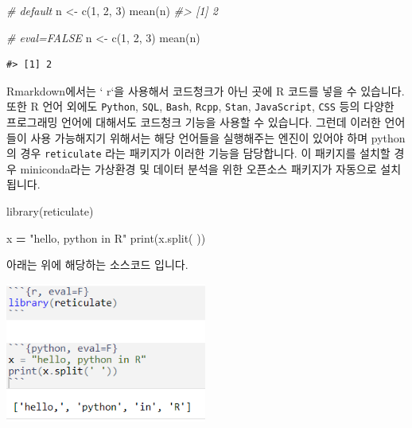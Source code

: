 \documentclass[
]{book}
\newenvironment{Shaded}{\begin{snugshade}}{\end{snugshade}}
\newcommand{\BuiltInTok}[1]{#1}
\newcommand{\CommentTok}[1]{\textcolor[rgb]{0.56,0.35,0.01}{\textit{#1}}}
\newcommand{\DecValTok}[1]{\textcolor[rgb]{0.00,0.00,0.81}{#1}}
\newcommand{\FunctionTok}[1]{\textcolor[rgb]{0.00,0.00,0.00}{#1}}
\newcommand{\NormalTok}[1]{#1}
\newcommand{\OperatorTok}[1]{\textcolor[rgb]{0.81,0.36,0.00}{\textbf{#1}}}
\newcommand{\OtherTok}[1]{\textcolor[rgb]{0.56,0.35,0.01}{#1}}
\newcommand{\StringTok}[1]{\textcolor[rgb]{0.31,0.60,0.02}{#1}}
\begin{document}
\begin{Shaded}
\begin{Highlighting}[]
\CommentTok{\# default}
\NormalTok{n }\OtherTok{\textless{}{-}} \FunctionTok{c}\NormalTok{(}\DecValTok{1}\NormalTok{, }\DecValTok{2}\NormalTok{, }\DecValTok{3}\NormalTok{)}
\FunctionTok{mean}\NormalTok{(n)}
\CommentTok{\#\textgreater{} [1] 2}
\end{Highlighting}
\end{Shaded}

\begin{Shaded}
\begin{Highlighting}[]
\CommentTok{\# eval=FALSE}
\NormalTok{n }\OtherTok{\textless{}{-}} \FunctionTok{c}\NormalTok{(}\DecValTok{1}\NormalTok{, }\DecValTok{2}\NormalTok{, }\DecValTok{3}\NormalTok{)}
\FunctionTok{mean}\NormalTok{(n)}
\end{Highlighting}
\end{Shaded}

\begin{verbatim}
#> [1] 2
\end{verbatim}

Rmarkdown에서는 ` r`을 사용해서 코드청크가 아닌 곳에 R 코드를 넣을 수 있습니다. 또한 R 언어 외에도 \texttt{Python}, \texttt{SQL}, \texttt{Bash}, \texttt{Rcpp}, \texttt{Stan}, \texttt{JavaScript}, \texttt{CSS} 등의 다양한 프로그래밍 언어에 대해서도 코드청크 기능을 사용할 수 있습니다. 그런데 이러한 언어들이 사용 가능해지기 위해서는 해당 언어들을 실행해주는 엔진이 있어야 하며 python의 경우 \texttt{reticulate} 라는 패키지가 이러한 기능을 담당합니다. 이 패키지를 설치할 경우 miniconda라는 가상환경 및 데이터 분석을 위한 오픈소스 패키지가 자동으로 설치됩니다.

\begin{Shaded}
\begin{Highlighting}[]
\FunctionTok{library}\NormalTok{(reticulate)}
\end{Highlighting}
\end{Shaded}

\begin{Shaded}
\begin{Highlighting}[]
\NormalTok{x }\OperatorTok{=} \StringTok{"hello, python in R"}
\BuiltInTok{print}\NormalTok{(x.split(}\StringTok{\textquotesingle{} \textquotesingle{}}\NormalTok{))}
\end{Highlighting}
\end{Shaded}

아래는 위에 해당하는 소스코드 입니다.

\includegraphics[width=2.60417in,height=\textheight]{images/02/lecticulate.png}
\end{document}
